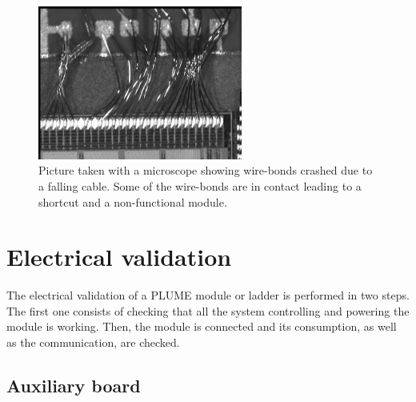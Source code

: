   \begin{figure}[!h]
    \centering
    \includegraphics[width=0.6\textwidth]{Pictures/labTests/crash_bonds.jpg}
    \caption{Picture taken with a microscope showing wire-bonds crashed due to a falling cable. Some of the wire-bonds are in contact leading to a shortcut and a non-functional module.}
    \label{fig:wireBondsCrashed}
  \end{figure}

\section{Electrical validation}

  The electrical validation of a \gls{PLUME} module or ladder is performed in two steps.
  The first one consists of checking that all the system controlling and powering the module is working. 
  Then, the module is connected and its consumption, as well as the communication, are checked.

  \subsection{Auxiliary board}

